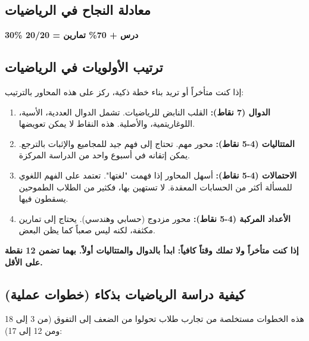 \documentclass[12pt,a4paper]{book}
\newcommand{\importantAr}[1]{%
	\begin{important}
		\bfseries #1
	\end{important}
}
\begin{document}
	\subsection{معادلة النجاح في الرياضيات}
	\begin{center}
		\Large
		\textbf{30\% درس + 70\% تمارين = 20/20}
	\end{center}
	
	\subsection{ترتيب الأولويات في الرياضيات}
	إذا كنت متأخراً أو تريد بناء خطة ذكية، ركز على هذه المحاور بالترتيب:
	
	\begin{enumerate}
		\item \textbf{الدوال (7 نقاط):} القلب النابض للرياضيات. تشمل الدوال العددية، الأسية، اللوغاريتمية، والأصلية. هذه النقاط لا يمكن تعويضها.
		\item \textbf{المتتاليات (4-5 نقاط):} محور مهم. تحتاج إلى فهم جيد للمجاميع والإثبات بالترجع. يمكن إتقانه في أسبوع واحد من الدراسة المركزة.
		\item \textbf{الاحتمالات (4-5 نقاط):} أسهل المحاور إذا فهمت "لغتها". تعتمد على الفهم اللغوي للمسألة أكثر من الحسابات المعقدة. لا تستهين بها، فكثير من الطلاب الطموحين يسقطون فيها.
		\item \textbf{الأعداد المركبة (4-5 نقاط):} محور مزدوج (حسابي وهندسي). يحتاج إلى تمارين مكثفة، لكنه ليس صعباً كما يظن البعض.
	\end{enumerate}
	
	\importantAr{إذا كنت متأخراً ولا تملك وقتاً كافياً: ابدأ بالدوال والمتتاليات أولاً. بهما تضمن 12 نقطة على الأقل.}
	
	\subsection{كيفية دراسة الرياضيات بذكاء (خطوات عملية)}
	هذه الخطوات مستخلصة من تجارب طلاب تحولوا من الضعف إلى التفوق (من 3 إلى 18 ومن 12 إلى 17):
	
\end{document}
